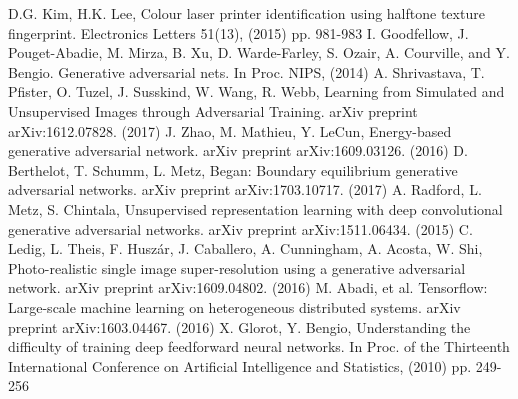 \documentclass[5p, times]{elsarticle}
\begin{document}
\begin{thebibliography}{1}
D.G. Kim, H.K. Lee, Colour laser printer identification using halftone texture fingerprint. Electronics Letters 51(13), (2015) pp. 981-983
I. Goodfellow, J. Pouget-Abadie, M. Mirza, B. Xu, D. Warde-Farley, S. Ozair, A. Courville, and Y. Bengio. Generative adversarial nets. In Proc. NIPS, (2014)
A. Shrivastava, T. Pfister, O. Tuzel, J. Susskind, W. Wang, R. Webb,  Learning from Simulated and Unsupervised Images through Adversarial Training. arXiv preprint arXiv:1612.07828. (2017)
J. Zhao, M. Mathieu, Y. LeCun, Energy-based generative adversarial network. arXiv preprint arXiv:1609.03126. (2016)
D. Berthelot, T. Schumm, L. Metz, Began: Boundary equilibrium generative adversarial networks. arXiv preprint arXiv:1703.10717. (2017)
A. Radford, L. Metz, S. Chintala, Unsupervised representation learning with deep convolutional generative adversarial networks. arXiv preprint arXiv:1511.06434. (2015)
C. Ledig, L. Theis, F. Huszár, J. Caballero, A. Cunningham, A. Acosta, W. Shi, Photo-realistic single image super-resolution using a generative adversarial network. arXiv preprint arXiv:1609.04802. (2016)
M. Abadi, et al. Tensorflow: Large-scale machine learning on heterogeneous distributed systems. arXiv preprint arXiv:1603.04467. (2016)
X. Glorot, Y. Bengio, Understanding the difficulty of training deep feedforward neural networks. In Proc. of the Thirteenth International Conference on Artificial Intelligence and Statistics, (2010) pp. 249-256

\end{thebibliography}
\end{document}

